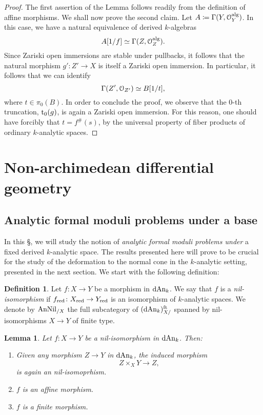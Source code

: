 \documentclass[10pt,a4paper,reqno]{amsart} %
\theoremstyle{plain}
\newtheorem{lem}[thm]{Lemma}
\theoremstyle{definition}
\newtheorem{defin}[thm]{Definition}
\theoremstyle{remark}
\numberwithin{equation}{section}
\begin{document}
\begin{proof} The first assertion of the Lemma follows readily from the definition of affine morphisms.
    We shall now prove the second claim. Let $A \coloneqq \Gamma(Y, \mathcal O_Y^\mathrm{alg})$. In this case, we have a natural equivalence of
    derived $k$-algebras
        \[
            A[1/f] \simeq \Gamma(Z, \mathcal O_Z^\mathrm{alg}).  
        \]
    Since Zariski open immersions are stable under pullbacks, it follows that the natural morphism $g' \colon Z' \to X$ is itself a Zariski
    open immersion. In particular, it follows that we can identify
        \[
            \Gamma(Z', \mathcal O_{Z'}) \simeq B[1/t],
        \]
    where $t \in \pi_0(B)$. In order to conclude the proof, we observe that the $0$-th truncation, $\mathrm{t}_0(g)$, is again a Zariski
    open immersion. For this reason, one should have forcibly that $t = f^\#(s)$, by the universal
    property of fiber products of ordinary $k$-analytic spaces.
\end{proof}


\section{Non-archimedean differential geometry}

\subsection{Analytic formal moduli problems under a base}
In this \S, we will study the notion of \emph{analytic formal moduli problems under} a fixed derived $k$-analytic space. The
results presented here will prove to be crucial for the study of the deformation to the normal cone in the $k$-analytic
setting, presented in the next section.
We start with the following definition:

\begin{defin}
    Let $f \colon X \to Y$ be a morphism in $\mathrm{dAn}_k$. We say that $f$ is a \emph{nil-isomorphism} if $f_{\mathrm{red}} \colon X_{\mathrm{red}} \to
    Y_{\mathrm{red}}$ is an isomorphism of $k$-analytic spaces. We denote by $\mathrm{AnNil}_{/ X}$ the full subcategory of $(\mathrm{dAn}_k)^{\mathrm{ft}}_{X/}$
    spanned by nil-isomorphisms $X \to Y$ of finite type.
\end{defin}

\begin{lem} \label{lem:nil-isos_are_affine_morphisms}
    Let $f \colon X \to Y$ be a nil-isomorphism in $\mathrm{dAn}_k$. Then:
    \begin{enumerate}
        \item Given any morphism $Z \to Y$ in $\mathrm{dAn}_k$, the induced morphism
            \[
                Z \times_X Y \to Z,  
            \]
        is again an nil-isomoprhism.
        \item $f$ is an affine morphism.
        \item $f$ is a finite morphism.
    \end{enumerate}
\end{lem}
\end{document}
